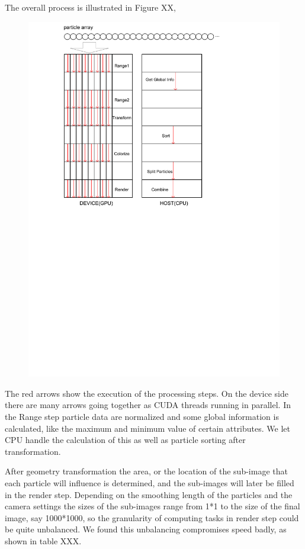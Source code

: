 The overall process is illustrated in Figure XX,
\begin{figure}
\begin{center}
\includegraphics[width=1.3\textwidth]{cu_splotch_process.pdf}
\end{center}
\end{figure}

The red arrows show the execution of the processing steps. On the device side there are many arrows going together as CUDA threads running in parallel. In the Range step particle data are normalized and some global information is calculated, like the maximum and minimum value of certain attributes. We let CPU handle the calculation of this as well as particle sorting after transformation.

After geometry transformation the area, or the location of the sub-image that each particle will influence is determined, and the sub-images will later be filled in the render step. Depending on the smoothing length of the particles and the camera settings the sizes of the sub-images range from 1*1 to the size of the final image, say 1000*1000, so the granularity of computing tasks in render step could be quite unbalanced.  We found this unbalancing compromises speed badly, as shown in table XXX.

